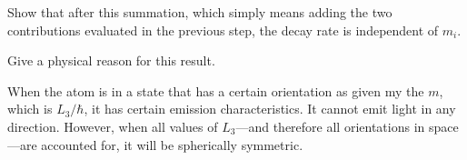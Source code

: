 \documentclass[11pt, english, fleqn, DIV=15, headinclude, BCOR=1.5cm]{scrartcl}
\begin{document}
\begin{problem}
    Show that after this summation, which simply means adding the two
    contributions evaluated in the previous step, the decay rate is independent
    of $m_i$.
\end{problem}

\begin{problem}
    Give a physical reason for this result.
\end{problem}

When the atom is in a state that has a certain orientation as given my the $m$,
which is $L_3 / \hbar$, it has certain emission characteristics. It cannot
emit light in any direction. However, when all values of $L_3$---and therefore
all orientations in space---are accounted for, it will be spherically
symmetric.
\end{document}
